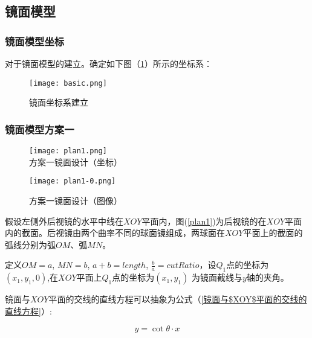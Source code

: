 \documentclass[withoutpreface,bwprint]{cumcmthesis} %
\begin{document}
\subsection{镜面模型}
\subsubsection{镜面模型坐标}

\par 对于镜面模型的建立。确定如下图（\ref{basic}）所示的坐标系：

\begin{figure}[!htb]
\centering
\texttt{[image: basic.png]}
\caption{镜面坐标系建立}
\label{basic}
\end{figure}


\subsubsection{镜面模型方案一}

\begin{figure}[!htbp]  
\begin{minipage}[t]{0.5\textwidth}
\centering  
\texttt{[image: plan1.png]} \\
\caption{方案一镜面设计（坐标）} \label{plan1}
\end{minipage}
\hspace{1ex}
\begin{minipage}[t]{0.5\textwidth}  
\centering  
\texttt{[image: plan1-0.png]}\\
\caption{方案一镜面设计（图像）}  \label{plan1-0}
\end{minipage}  
\end{figure} 


\par 假设左侧外后视镜的水平中线在$XOY$平面内，图(\ref{plan1})为后视镜的在$XOY$平面内的截面。后视镜由两个曲率不同的球面镜组成，两球面在$XOY$平面上的截面的弧线分别为弧$OM$、弧$MN$。

\par 定义$OM = a$, $MN = b$, $a + b = length$, $\frac{b}{a} = cutRatio$，设$Q_1$点的坐标为$(x_1,y_1,0)$,在$XOY$平面上$Q_1$点的坐标为$(x_1,y_1)$ 为镜面截线与$y$轴的夹角。

\par 镜面与$XOY$平面的交线的直线方程可以抽象为公式（\ref{镜面与$XOY$平面的交线的直线方程}）:
 
\begin{equation}
\label{镜面与$XOY$平面的交线的直线方程}
	y = \mathop{cot}\theta \cdot x
\end{equation}
\end{document}

